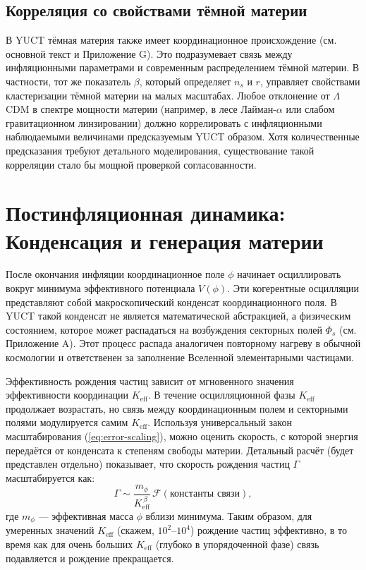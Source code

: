\documentclass[12pt,a4paper]{article}
\theoremstyle{remark}
\newcommand{\Keff}{K_{\mathrm{eff}}}
\begin{document}
	\subsection{Корреляция со свойствами тёмной материи}
	
	В YUCT тёмная материя также имеет координационное происхождение (см. основной текст и Приложение G). Это подразумевает связь между инфляционными параметрами и современным распределением тёмной материи. В частности, тот же показатель $\beta$, который определяет $n_s$ и $r$, управляет свойствами кластеризации тёмной материи на малых масштабах. Любое отклонение от $\Lambda$CDM в спектре мощности материи (например, в лесе Лайман-$\alpha$ или слабом гравитационном линзировании) должно коррелировать с инфляционными наблюдаемыми величинами предсказуемым YUCT образом. Хотя количественные предсказания требуют детального моделирования, существование такой корреляции стало бы мощной проверкой согласованности.
	
	\section{Постинфляционная динамика: Конденсация и генерация материи}
	\label{sec:postinflation}
	
	После окончания инфляции координационное поле $\phi$ начинает осциллировать вокруг минимума эффективного потенциала $V(\phi)$. Эти когерентные осцилляции представляют собой макроскопический конденсат координационного поля. В YUCT такой конденсат не является математической абстракцией, а физическим состоянием, которое может распадаться на возбуждения секторных полей $\Phi_s$ (см. Приложение A). Этот процесс распада аналогичен повторному нагреву в обычной космологии и ответственен за заполнение Вселенной элементарными частицами.
	
	Эффективность рождения частиц зависит от мгновенного значения эффективности координации $\Keff$. В течение осцилляционной фазы $\Keff$ продолжает возрастать, но связь между координационным полем и секторными полями модулируется самим $\Keff$. Используя универсальный закон масштабирования (\ref{eq:error-scaling}), можно оценить скорость, с которой энергия передаётся от конденсата к степеням свободы материи. Детальный расчёт (будет представлен отдельно) показывает, что скорость рождения частиц $\Gamma$ масштабируется как:
	\begin{equation}
		\Gamma \sim \frac{m_\phi}{\Keff^{\,\beta}} \, \mathcal{F}(\text{константы связи}),
		\label{eq:gamma}
	\end{equation}
	где $m_\phi$ — эффективная масса $\phi$ вблизи минимума. Таким образом, для умеренных значений $\Keff$ (скажем, $10^2$–$10^4$) рождение частиц эффективно, в то время как для очень больших $\Keff$ (глубоко в упорядоченной фазе) связь подавляется и рождение прекращается.
	
\end{document}

